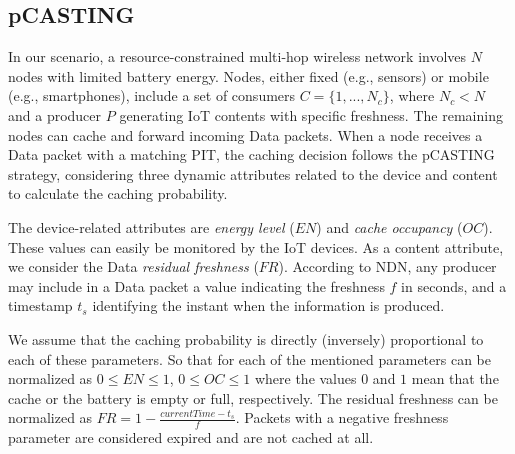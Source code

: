 \documentclass[conference]{IEEEtran}
\begin{document}
\subsection{pCASTING}



In our scenario, a resource-constrained multi-hop wireless network involves $N$ nodes with limited battery energy. Nodes, either fixed 
(e.g., sensors) or mobile (e.g., smartphones), include a set of consumers $C = \{1, ..., N_c\}$, where $N_c < N$ and a producer $P$ generating 
IoT contents with specific freshness. The remaining nodes can cache and forward incoming Data packets. When a node receives a Data packet 
with a matching PIT, the caching decision follows the pCASTING strategy, considering three dynamic attributes related to the device and 
content to calculate the caching probability.

The device-related attributes are \textit{energy level} ($EN$) and \textit{cache occupancy} ($OC$). These values can easily be monitored by the
IoT devices. As a content attribute, we consider the Data \textit{residual freshness} ($FR$). According to NDN, any producer may include in a Data packet a value indicating the freshness $f$ in seconds,
and a timestamp $t_s$ identifying the instant when the information is produced.

We assume that the caching probability is directly (inversely) proportional to each of these parameters. So that for each of the mentioned parameters can be
normalized as $0 \leq EN \leq 1$, $0 \leq OC \leq 1$ where the values $0$ and $1$ mean that the cache or the battery is empty or full, respectively.
The residual freshness can be normalized as $ FR = 1 - \frac{currentTime - t_s}{f}$.
Packets with a negative freshness parameter are considered expired and are not cached at all.
\end{document}
